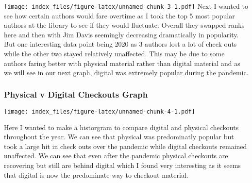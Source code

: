 \documentclass[
]{article}
\begin{document}
\texttt{[image: index\_files/figure-latex/unnamed-chunk-3-1.pdf]} Next I
wanted to see how certain authors would fare overtime as I took the top
5 most popular authors at the library to see if they would fluctuate.
Overall they swapped ranks here and then with Jim Davis seemingly
decreasing dramatically in popularity. But one interesting data point
being 2020 as 3 authors lost a lot of check outs while the other two
stayed relatively unaffected. This may be due to some authors faring
better with physical material rather than digital material and as we
will see in our next graph, digital was extremely popular during the
pandemic.

\hypertarget{physical-v-digital-checkouts-graph}{%
\subsubsection{Physical v Digital Checkouts
Graph}\label{physical-v-digital-checkouts-graph}}

\texttt{[image: index\_files/figure-latex/unnamed-chunk-4-1.pdf]}

Here I wanted to make a historgram to compare digital and physical
checkouts throughout the year. We can see that physical was predominatly
popular but took a large hit in check outs over the pandemic while
digital checkouts remained unaffected. We can see that even after the
pandemic physical checkouts are recovering but still are behind digital
which I found very interesting as it seems that digital is now the
predominate way to checkout material.
\end{document}

